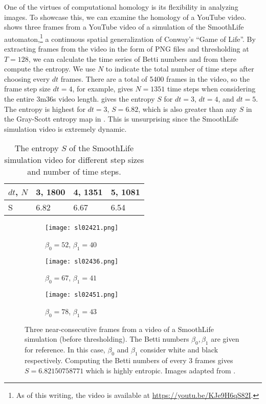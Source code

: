 One of the virtues of computational homology is its flexibility in analyzing images. To showcase this, we can examine the homology of a YouTube video.  shows three frames from a YouTube video of a simulation of the SmoothLife automaton,\footnote{As of this writing, the video is available at \url{https://youtu.be/KJe9H6qS82I}.} a continuous spatial generalization of Conway's ``Game of Life''. By extracting frames from the video in the form of PNG files and thresholding at $T = 128$, we can calculate the time series of Betti numbers and from there compute the entropy. We use $N$ to indicate the total number of time steps after choosing every $dt$ frames. There are a total of 5400 frames in the video, so the frame step size $dt = 4$, for example, gives $N = 1351$ time steps when considering the entire 3m36s video length.  gives the entropy $S$ for $dt = 3$, $dt = 4$, and $dt = 5$. The entropy is highest for $dt = 3$, $S = 6.82$, which is also greater than any $S$ in the Gray-Scott entropy map in . This is unsurprising since the SmoothLife simulation video is extremely dynamic.
%
\begin{table}
	\caption{The entropy $S$ of the SmoothLife simulation video for different step sizes and number of time steps.} \label{tab:smoothlife}
	\centering
	\renewcommand{\arraystretch}{1.5}
	\begin{tabular}{l | l l l }
	$dt$, $N$		& 3, 1800		& 4, 1351		& 5, 1081 \\
	\hline
	S			& 6.82	& 6.67		& 6.54
	\end{tabular}
\end{table}%

\begin{figure}[h]
	\centering
	\begin{subfigure}[b]{0.3\textwidth}
		\texttt{[image: sl02421.png]}
		\caption{$\beta_0 = 52$, $\beta_1 = 40$} \label{fig:sl2421}
	\end{subfigure} \quad
	\begin{subfigure}[b]{0.3\textwidth}
		\texttt{[image: sl02436.png]}
		\caption{$\beta_0 = 67$, $\beta_1 = 41$} \label{fig:sl02436}
	\end{subfigure} \quad
	\begin{subfigure}[b]{0.3\textwidth}
		\texttt{[image: sl02451.png]}
		\caption{$\beta_0 = 78$, $\beta_1 = 43$} \label{fig:sl02451}
	\end{subfigure}
	\caption{Three near-consecutive frames from a video of a SmoothLife simulation (before thresholding). The Betti numbers $\beta_0, \beta_1$ are given for reference. In this case, $\beta_0$ and $\beta_1$ consider white and black respectively. Computing the Betti numbers of every 3 frames gives $S = 6.82150758771$ which is highly entropic. Images adapted from \protect{}.} \label{fig:smoothlife}
\end{figure}
